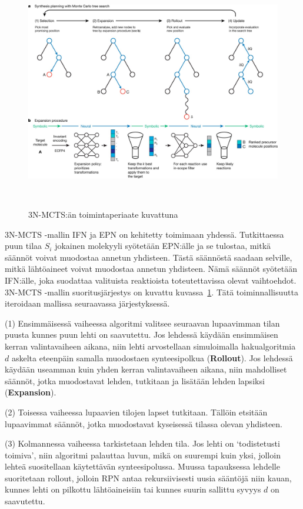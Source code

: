 \documentclass[finnish,twoside,censored,tkt,sw-line]{HYthesisML}
\begin{document}
\begin{figure}[!ht]
    \centering
    \includegraphics[width=\textwidth]{3N-MCTS-fig.jpg}
    \caption{3N-MCTS:än toimintaperiaate kuvattuna}
    {~\cite{SeglerMarwinHS2018Pcsw}}
    \label{fig:3n-mcts-model}
\end{figure}

3N-MCTS -mallin IFN ja EPN on kehitetty toimimaan yhdessä.
Tutkittaessa puun tilaa \(S_i\) jokainen molekyyli syötetään EPN:älle ja se tulostaa, mitkä säännöt voivat muodostaa annetun yhdisteen.
Tästä säännöstä saadaan selville, mitkä lähtöaineet voivat muodostaa annetun yhdisteen.
Nämä säännöt syötetään IFN:älle, joka suodattaa valituista reaktioista toteutettavissa olevat vaihtoehdot.
3N-MCTS -mallin suoritusjärjestys on kuvattu kuvassa~\ref{fig:3n-mcts-model}.
Tätä toiminnallisuutta iteroidaan mallissa seuraavassa järjestyksessä.

(1) Ensimmäisessä vaiheessa algoritmi valitsee seuraavan lupaavimman tilan puusta kunnes puun lehti on saavutettu.
Jos lehdessä käydään ensimmäisen kerran valintavaiheen aikana, niin lehti arvostellaan simuloimalla hakualgoritmia \(d\) askelta eteenpäin samalla muodostaen synteesipolkua (\textbf{Rollout}).
Jos lehdessä käydään useamman kuin yhden kerran valintavaiheen aikana, niin mahdolliset säännöt, jotka muodostavat lehden, tutkitaan ja lisätään lehden lapsiksi (\textbf{Expansion}).

(2) Toisessa vaiheessa lupaavien tilojen lapset tutkitaan.
Tällöin etsitään lupaavimmat säännöt, jotka muodostavat kyseisessä tilassa olevan yhdisteen.

(3) Kolmannessa vaiheessa tarkistetaan lehden tila.
Jos lehti on `todistetusti toimiva', niin algoritmi palauttaa luvun, mikä on suurempi kuin yksi, jolloin lehteä suositellaan käytettävän synteesipolussa.
Muussa tapauksessa lehdelle suoritetaan rollout, jolloin RPN antaa rekursiivisesti uusia sääntöjä niin kauan, kunnes lehti on pilkottu lähtöaineisiin tai kunnes suurin sallittu syvyys \(d\) on saavutettu.
\end{document}
